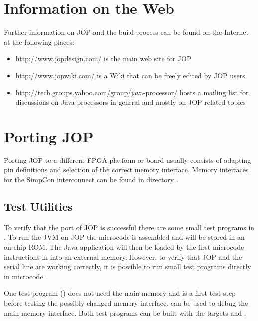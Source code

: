\section{Information on the Web}

Further information on JOP and the build process can be found on the
Internet at the following places:

\begin{itemize}
    \item \url{http://www.jopdesign.com/} is the main web site
        for JOP
    \item \url{http://www.jopwiki.com/} is a Wiki that can be
        freely edited by JOP users.
    \item
        \url{http://tech.groups.yahoo.com/group/java-processor/}
        hosts a mailing list for discussions on Java processors
        in general and mostly on JOP related topics
\end{itemize}


\section{Porting JOP}

Porting JOP to a different FPGA platform or board usually consists
of adapting pin definitions and selection of the correct memory
interface. Memory interfaces for the SimpCon interconnect can be
found in directory .

\subsection{Test Utilities}

To verify that the port of JOP is successful there are some small
test programs in . To run the JVM on JOP the
microcode  is assembled and will be stored in an
on-chip ROM. The Java application will then be loaded by the first
microcode instructions in  into an external memory.
However, to verify that JOP and the serial line are working
correctly, it is possible to run small test programs directly in
microcode.

One test program () does not need the main memory and
is a first test step before testing the possibly changed memory
interface.  can be used to debug the main memory
interface. Both test programs can be built with the 
targets  and .

